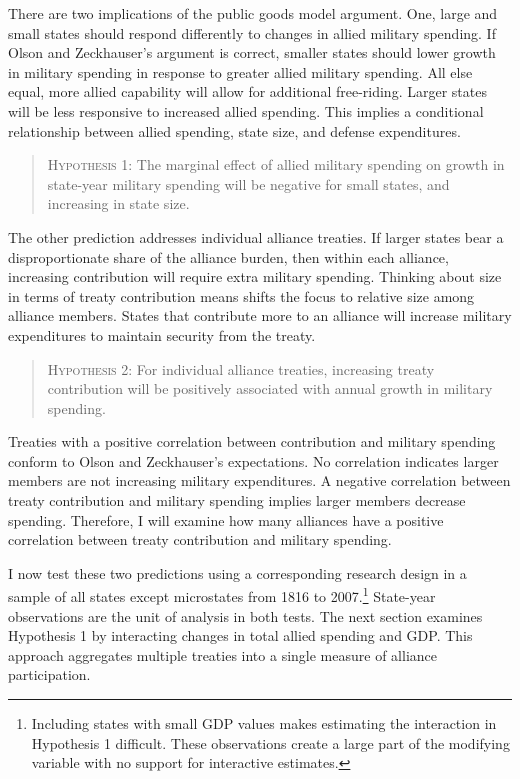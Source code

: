 \documentclass[12pt]{article}
\begin{document}
There are two implications of the public goods model argument. 
One, large and small states should respond differently to changes in allied military spending. 
If Olson and Zeckhauser's argument is correct, smaller states should lower growth in military spending in response to greater allied military spending. 
All else equal, more allied capability will allow for additional free-riding.  
Larger states will be less responsive to increased allied spending. 
This implies a conditional relationship between allied spending, state size, and defense expenditures. 


\begin{quote}
\textsc{Hypothesis 1}: The marginal effect of allied military spending on growth in state-year military spending will be negative for small states, and increasing in state size. 
\end{quote}


The other prediction addresses individual alliance treaties. 
If larger states bear a disproportionate share of the alliance burden, then within each alliance, increasing contribution will require extra military spending. 
Thinking about size in terms of treaty contribution means shifts the focus to relative size among alliance members. 
States that contribute more to an alliance will increase military expenditures to maintain security from the treaty. 


\begin{quote}
\textsc{Hypothesis 2}: For individual alliance treaties, increasing treaty contribution will be positively associated with annual growth in military spending. 
\end{quote}


Treaties with a positive correlation between contribution and military spending conform to Olson and Zeckhauser's expectations. 
No correlation indicates larger members are not increasing military expenditures.
A negative correlation between treaty contribution and military spending implies larger members decrease spending. 
Therefore, I will examine how many alliances have a positive correlation between treaty contribution and military spending. 


I now test these two predictions using a corresponding research design in a sample of all states except microstates from 1816 to 2007.\footnote{Including states with small GDP values makes estimating the interaction in Hypothesis 1 difficult. These observations create a large part of the modifying variable with no support for interactive estimates.}
State-year observations are the unit of analysis in both tests. 
The next section examines Hypothesis 1 by interacting changes in total allied spending and GDP.
This approach aggregates multiple treaties into a single measure of alliance participation. 
\end{document}
